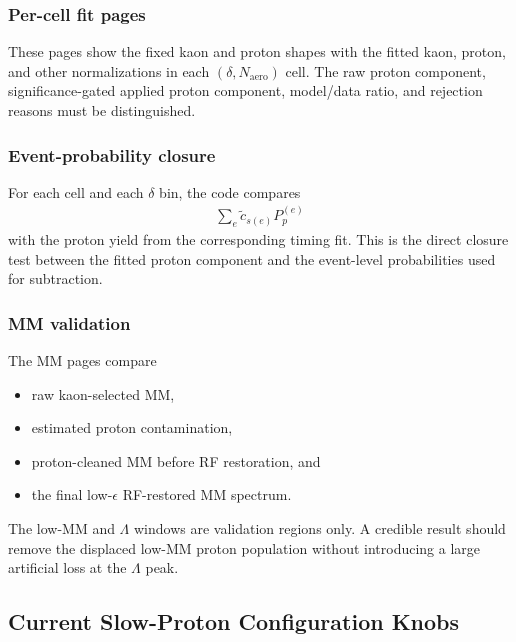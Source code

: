 \documentclass[11pt]{article}
\begin{document}
\subsubsection*{Per-cell fit pages}

These pages show the fixed kaon and proton shapes with the fitted kaon, proton,
and other normalizations in each $(\delta,N_{\mathrm{aero}})$ cell.  The raw
proton component, significance-gated applied proton component, model/data ratio,
and rejection reasons must be distinguished.

\subsubsection*{Event-probability closure}

For each cell and each $\delta$ bin, the code compares
\begin{align}
  \sum_{e}\widetilde c_{s(e)}P_p^{(e)}
\end{align}
with the proton yield from the corresponding timing fit.  This is the direct
closure test between the fitted proton component and the event-level
probabilities used for subtraction.

\subsubsection*{MM validation}

The MM pages compare
\begin{itemize}[leftmargin=2em]
  \item raw kaon-selected MM,
  \item estimated proton contamination,
  \item proton-cleaned MM before RF restoration, and
  \item the final low-$\epsilon$ RF-restored MM spectrum.
\end{itemize}
The low-MM and $\Lambda$ windows are validation regions only.  A credible result
should remove the displaced low-MM proton population without introducing a
large artificial loss at the $\Lambda$ peak.

\subsection{Current Slow-Proton Configuration Knobs}
\end{document}
